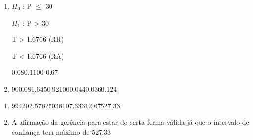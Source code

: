 
\begin{question}
    
    \begin{enumerate}[label={\textbf{\alph*)}}]
        
        \item 
        
            $H_0$ : P $\leq$ 30 

            $H_1$ : P > 30 
        
            T > 1.6766 (RR)

            T < 1.6766 (RA)

            \begin{formula8}
                {0.08}{0.1}{}{100}{-0.67}
            \end{formula8}

        \item 
    
            \begin{formula3}
                {90}{0.08}{1.645}{0.92}{100}{0.044}{0.036}{0.124}
            \end{formula3}

    \end{enumerate}
\end{question}


\begin{question}
    
    \begin{enumerate}[label={\textbf{\alph*)}}]
        
        \item 

            \begin{formula1}
                {99}{420}{2.576}{250}{36}{107.33}{312.67}{527.33}
            \end{formula1}

        \item 
    
            A afirmação da gerência para estar de certa forma válida já que o intervalo de 
            confiança tem máximo de 527.33

    \end{enumerate}
\end{question}

